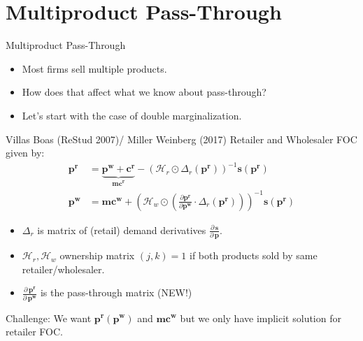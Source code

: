 \documentclass[aspectratio=169,10pt]{beamer}
\begin{document}
\section{Multiproduct Pass-Through}


\begin{frame}{Multiproduct Pass-Through}

\begin{itemize}
\item Most firms sell multiple products.
\item How does that affect what we know about pass-through?
\item Let's start with the case of \alert{double marginalization}.
\end{itemize}
\end{frame}

\begin{frame}{Villas Boas (ReStud 2007)/ Miller Weinberg (2017)}
Retailer and Wholesaler FOC given by:
\begin{align*}
\symbf{p^r} &= \underbrace{\symbf{p^w} +\symbf{c^r}}_{\symbf{mc^r}} -(\mathcal{H}_r \odot \Delta_{r}(\symbf{p^r}))^{-1} \symbf{s}(\symbf{p^r})\\
\symbf{p^w}  &= \symbf{mc^w} + \left(\mathcal{H}_{w} \odot \left( \frac{\partial \symbf{p^r}}{\partial \symbf{p^w}} \cdot  \Delta_r(\symbf{p^r} ) \right) \right)^{-1} \symbf{s}(\symbf{p^r})
\end{align*}
\begin{itemize}
  \item $\Delta_r$ is matrix of (retail) demand derivatives $\frac{\partial\, \symbf{s}}{\partial\, \symbf{p}}$.
\item $\mathcal{H}_r,\mathcal{H}_w$  ownership matrix $(j,k)=1$ if both products sold by same retailer/wholesaler.
\item $\frac{\partial\, \symbf{p^r}}{\partial\, \symbf{p^w}}$ is the \alert{pass-through matrix} (NEW!)
\end{itemize}
Challenge: We want $\symbf{p^r}(\symbf{p^w})$ and $\symbf{mc^w}$ but we only have implicit solution for retailer FOC.
\end{frame}
\end{document}
